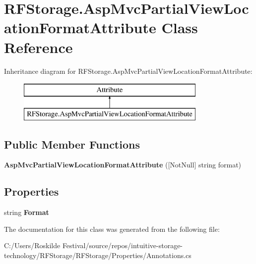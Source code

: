 \hypertarget{class_r_f_storage_1_1_asp_mvc_partial_view_location_format_attribute}{}\section{R\+F\+Storage.\+Asp\+Mvc\+Partial\+View\+Location\+Format\+Attribute Class Reference}
\label{class_r_f_storage_1_1_asp_mvc_partial_view_location_format_attribute}
Inheritance diagram for R\+F\+Storage.\+Asp\+Mvc\+Partial\+View\+Location\+Format\+Attribute\+:\begin{figure}[H]
\begin{center}
\leavevmode
\includegraphics[height=2.000000cm]{class_r_f_storage_1_1_asp_mvc_partial_view_location_format_attribute}
\end{center}
\end{figure}
\subsection*{Public Member Functions}
\begin{DoxyCompactItemize}
\item 
\mbox{\label{class_r_f_storage_1_1_asp_mvc_partial_view_location_format_attribute_a42254acedf0350de41349b8ec934d10d}} 
{\bfseries Asp\+Mvc\+Partial\+View\+Location\+Format\+Attribute} (\mbox{[}Not\+Null\mbox{]} string format)
\end{DoxyCompactItemize}
\subsection*{Properties}
\begin{DoxyCompactItemize}
\item 
\mbox{\label{class_r_f_storage_1_1_asp_mvc_partial_view_location_format_attribute_a4e08f53a559ba49a213231e359d60b9e}} 
string {\bfseries Format}
\end{DoxyCompactItemize}


The documentation for this class was generated from the following file\+:\begin{DoxyCompactItemize}
\item 
C\+:/\+Users/\+Roskilde Festival/source/repos/intuitive-\/storage-\/technology/\+R\+F\+Storage/\+R\+F\+Storage/\+Properties/Annotations.\+cs\end{DoxyCompactItemize}
